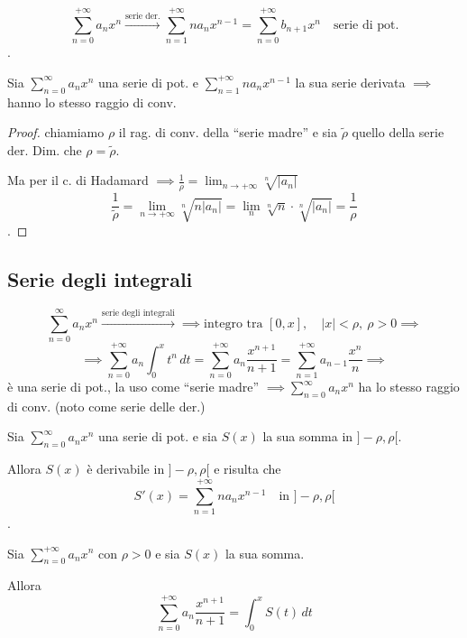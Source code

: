 \[
\sum_{n=0}^{+\infty} a_n x^n \xrightarrow{\text{serie der.}} \sum_{n=1}^{+\infty} n a_n x^{n-1} = \sum_{n=0}^{+\infty} b_{n+1} x^n \quad \text{serie di pot.}
\]
.

\begin{prop}
Sia $\sum_{n=0}^{\infty} a_n x^n$ una serie di pot. e $\sum_{n=1}^{+\infty} n a_n x^{n-1}$ la sua serie derivata $\implies$ hanno lo stesso raggio di conv.
\end{prop}

\begin{proof}
 chiamiamo $\rho$ il rag. di conv. della ``serie madre'' e sia $\tilde{\rho}$ quello della serie der. Dim. che $\rho = \tilde{\rho}$.

Ma per il c. di Hadamard $\implies \frac{1}{\rho} = \lim_{n \to +\infty} \sqrt[n]{\vert a_n \vert}$
\[
\frac{1}{\tilde{\rho}} = \lim_{n \to +\infty} \sqrt[n]{n \vert a_n \vert} = \lim_{n} \sqrt[n]{n} \cdot \sqrt[n]{\vert a_n \vert} = \frac{1}{\rho}
\]
.
\end{proof}

\subsection{Serie degli integrali}

\[
\sum_{n=0}^{\infty} a_n x^n \xrightarrow{\text{serie degli integrali}} \implies \text{integro tra } [0, x], \quad \vert x \vert < \rho, \ \rho > 0 \implies
\]
\[
\implies \sum_{n=0}^{+\infty} a_n \int_0^x t^n \, dt = \sum_{n=0}^{+\infty} a_n \frac{x^{n+1}}{n+1} = \sum_{n=1}^{+\infty} a_{n-1} \frac{x^n}{n} \implies
\]
è una serie di pot., la uso come ``serie madre'' $\implies \sum_{n=0}^{\infty} a_n x^n$ ha lo stesso raggio di conv. (noto come serie delle der.)

\begin{theorem}
Sia $\sum_{n=0}^{\infty} a_n x^n$ una serie di pot. e sia $S(x)$ la sua somma in $]-\rho, \rho[$.

Allora $S(x)$ è derivabile in $]-\rho, \rho[$ e risulta che
\[
S'(x) = \sum_{n=1}^{+\infty} n a_n x^{n-1} \quad \text{in } ]-\rho, \rho[
\]
\pencilnote{(itero $\implies S(x) \in C^\infty(]-\rho, \rho[)$)}.
\end{theorem}

\begin{theorem}
Sia $\sum_{n=0}^{+\infty} a_n x^n$ con $\rho > 0$ e sia $S(x)$ la sua somma.

Allora
\[
\sum_{n=0}^{+\infty} a_n \frac{x^{n+1}}{n+1} = \int_0^x S(t) \, dt
\]
\end{theorem}

